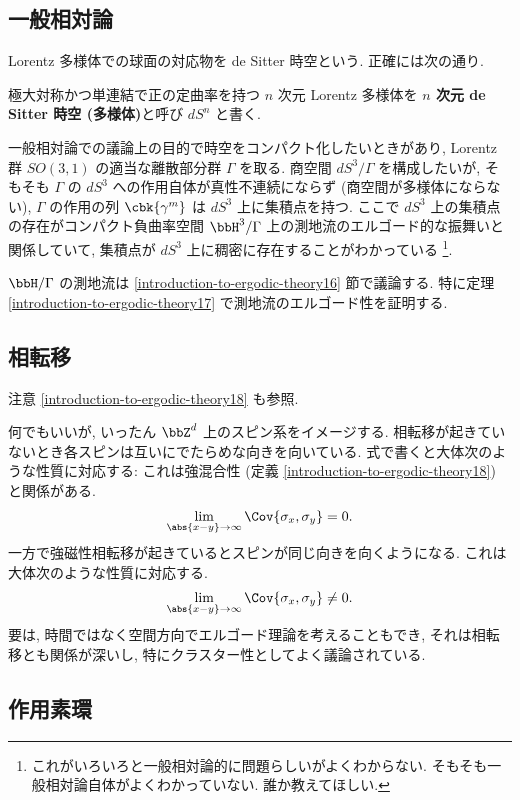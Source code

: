 \documentclass[openany, a4paper, oneside]{jsbook}
\begin{document}
\subsection{一般相対論}

Lorentz 多様体での球面の対応物を de Sitter 時空という.
正確には次の通り.
\begin{defn}[de Sitter 時空]
極大対称かつ単連結で正の定曲率を持つ $n$ 次元 Lorentz 多様体を
\textbf{$n$ 次元 de Sitter 時空 (多様体)}と呼び $dS^n$ と書く.
\end{defn}
一般相対論での議論上の目的で時空をコンパクト化したいときがあり,
Lorentz 群 $SO(3, 1)$ の適当な離散部分群 $\Gamma$ を取る.
商空間 $dS^3 / \Gamma$ を構成したいが,
そもそも $\Gamma$ の $dS^3$ への作用自体が真性不連続にならず (商空間が多様体にならない),
$\Gamma$ の作用の列 $\cbk{\gamma^m}$ は $dS^3$ 上に集積点を持つ.
ここで $dS^3$ 上の集積点の存在がコンパクト負曲率空間
$\bbH^3 / \Gamma$ 上の測地流のエルゴード的な振舞いと関係していて,
集積点が $dS^3$ 上に稠密に存在することがわかっている\cite{IshiabashiKoikeSiinoKojima1} \footnote{これがいろいろと一般相対論的に問題らしいがよくわからない.
そもそも一般相対論自体がよくわかっていない.
誰か教えてほしい.}.

$\bbH / \Gamma$ の測地流は \ref{introduction-to-ergodic-theory16} 節で議論する.
特に定理 \ref{introduction-to-ergodic-theory17} で測地流のエルゴード性を証明する.
\subsection{相転移}

注意 \ref{introduction-to-ergodic-theory18} も参照.

何でもいいが, いったん $\bbZ^d$ 上のスピン系をイメージする.
相転移が起きていないとき各スピンは互いにでたらめな向きを向いている.
式で書くと大体次のような性質に対応する: これは強混合性 (定義 \ref{introduction-to-ergodic-theory18}) と関係がある.
\begin{align}
 \lim_{\abs{x - y} \to \infty}\Cov{\sigma_x, \sigma_y}
 = 0.
\end{align}
一方で強磁性相転移が起きているとスピンが同じ向きを向くようになる.
これは大体次のような性質に対応する.
\begin{align}
 \lim_{\abs{x - y} \to \infty}\Cov{\sigma_x, \sigma_y}
 \neq 0.
\end{align}
要は, 時間ではなく空間方向でエルゴード理論を考えることもでき,
それは相転移とも関係が深いし, 特にクラスター性としてよく議論されている.
\subsection{作用素環}
\end{document}
